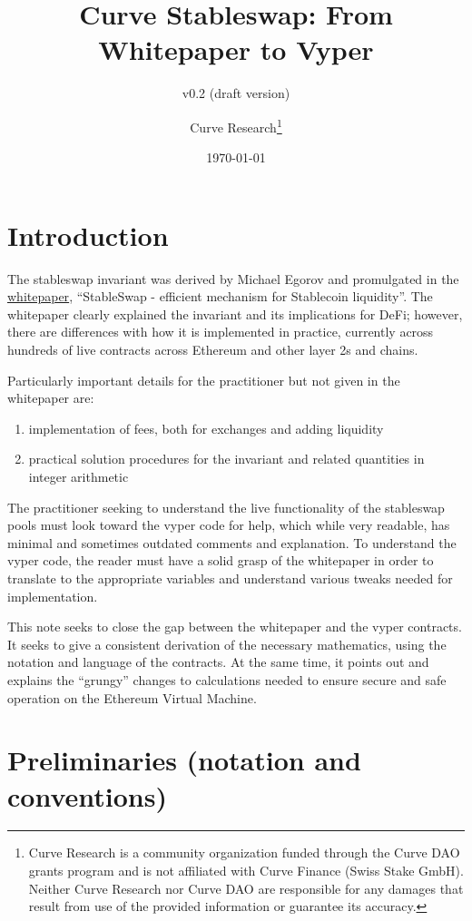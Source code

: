 \documentclass[
]{article}
\title{Curve Stableswap: From Whitepaper to Vyper}
\subtitle{v0.2 (draft version)}
\author{Curve
Research\footnote{Curve Research is a community organization funded through the Curve DAO grants program and is not affiliated with Curve Finance (Swiss Stake GmbH).  Neither Curve Research nor Curve DAO are responsible for any damages that result from use of the provided information or guarantee its accuracy.}}
\date{\today}
\providecommand{\tightlist}{%
  \setlength{\itemsep}{0pt}\setlength{\parskip}{0pt}}
\begin{document}
\maketitle

\hypertarget{introduction}{%
\section{Introduction}\label{introduction}}

The stableswap invariant was derived by Michael Egorov and promulgated
in the \href{https://curve.fi/files/stableswap-paper.pdf}{whitepaper},
``StableSwap - efficient mechanism for Stablecoin liquidity''. The
whitepaper clearly explained the invariant and its implications for
DeFi; however, there are differences with how it is implemented in
practice, currently across hundreds of live contracts across Ethereum
and other layer 2s and chains.

Particularly important details for the practitioner but not given in the
whitepaper are:

\begin{enumerate}
\def\labelenumi{\arabic{enumi}.}
\tightlist
\item
  implementation of fees, both for exchanges and adding liquidity
\item
  practical solution procedures for the invariant and related quantities
  in integer arithmetic
\end{enumerate}

The practitioner seeking to understand the live functionality of the
stableswap pools must look toward the vyper code for help, which while
very readable, has minimal and sometimes outdated comments and
explanation. To understand the vyper code, the reader must have a solid
grasp of the whitepaper in order to translate to the appropriate
variables and understand various tweaks needed for implementation.

This note seeks to close the gap between the whitepaper and the vyper
contracts. It seeks to give a consistent derivation of the necessary
mathematics, using the notation and language of the contracts. At the
same time, it points out and explains the ``grungy'' changes to
calculations needed to ensure secure and safe operation on the Ethereum
Virtual Machine.

\hypertarget{preliminaries-notation-and-conventions}{%
\section{Preliminaries (notation and
conventions)}\label{preliminaries-notation-and-conventions}}
\end{document}
